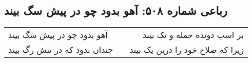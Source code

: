 \begin{center}
\section*{رباعی شماره ۵۰۸: آهو بدود چو در پیش سگ بیند}
\label{sec:0508}
\begin{longtable}{l p{0.5cm} r}
آهو بدود چو در پیش سگ بیند
&&
بر اسب دونده حمله و تک بیند
\\
چندان بدود که در تنش رگ بیند
&&
زیرا که صلاح خود را درین یک بیند
\\
\end{longtable}
\end{center}
